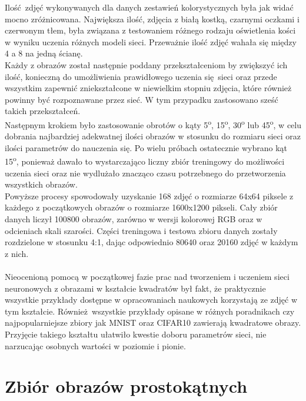 Ilość zdjęć wykonywanych dla danych zestawień kolorystycznych była jak widać mocno
zróżnicowana. Największa ilość, zdjęcia z białą kostką, czarnymi oczkami i czerwonym
tłem, była związana z testowaniem różnego rodzaju oświetlenia kości w wyniku uczenia
różnych modeli sieci. Przeważnie ilość zdjęć wahała się między 4 a 8 na jedną ścianę. \\
Każdy z obrazów został następnie poddany przekształceniom by zwiększyć ich ilość,
konieczną do umożliwienia prawidłowego uczenia się sieci oraz przede wszystkim zapewnić
zniekształcone w niewielkim stopniu zdjęcia, które również powinny być rozpoznawane przez
sieć. W tym przypadku zastosowano sześć takich przekształceń. \\
Następnym krokiem było zastosowanie obrotów o kąty 5\textsuperscript{o},
15\textsuperscript{o}, 30\textsuperscript{o} lub 45\textsuperscript{o}, w celu dobrania
najbardziej adekwatnej ilości obrazów w stosunku do rozmiaru sieci oraz ilości parametrów
do nauczenia się. Po wielu próbach ostatecznie wybrano kąt 15\textsuperscript{o}, ponieważ
dawało to wystarczająco liczny zbiór treningowy do możliwości uczenia sieci oraz nie
wydlużało znacząco czasu potrzebnego do przetworzenia wszystkich obrazów. \\
Powyższe procesy spowodowały uzyskanie 168 zdjęć o rozmiarze 64x64 piksele z każdego
z początkowych obrazów o rozmiarze 1600x1200 pikseli. Cały zbiór danych liczył 100800
obrazów, zarówno w wersji kolorowej RGB oraz w odcieniach skali szarości. Części
treningowa i testowa zbioru danych zostały rozdzielone w stosunku 4:1, dając odpowiednio
80640 oraz 20160 zdjęć w każdym z nich. \\\\
Nieocenioną pomocą w początkowej fazie prac nad tworzeniem i uczeniem sieci neuronowych
z obrazami w kształcie kwadratów był fakt, że praktycznie wszystkie przykłady dostępne
w opracowaniach naukowych korzystają ze zdjęć w tym kształcie. Również wszystkie
przykłady opisane w różnych poradnikach czy najpopularniejsze zbiory jak MNIST oraz
CIFAR10 zawierają kwadratowe obrazy. Przyjęcie takiego kształtu ułatwiło kwestie
doboru parametrów sieci, nie narzucając osobnych wartości w poziomie i pionie.

 \section{Zbiór obrazów prostokątnych}

